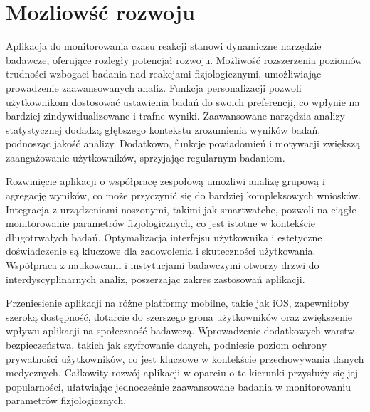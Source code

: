 \section{Mozliowść rozwoju}
Aplikacja do monitorowania czasu reakcji stanowi dynamiczne narzędzie badawcze, oferujące rozległy potencjał rozwoju. Możliwość rozszerzenia poziomów trudności wzbogaci badania nad reakcjami fizjologicznymi, umożliwiając prowadzenie zaawansowanych analiz. Funkcja personalizacji pozwoli użytkownikom dostosować ustawienia badań do swoich preferencji, co wpłynie na bardziej zindywidualizowane i trafne wyniki. Zaawansowane narzędzia analizy statystycznej dodadzą głębszego kontekstu zrozumienia wyników badań, podnosząc jakość analizy. Dodatkowo, funkcje powiadomień i motywacji zwiększą zaangażowanie użytkowników, sprzyjając regularnym badaniom.

Rozwinięcie aplikacji o współpracę zespołową umożliwi analizę grupową i agregację wyników, co może przyczynić się do bardziej kompleksowych wniosków. Integracja z urządzeniami noszonymi, takimi jak smartwatche, pozwoli na ciągłe monitorowanie parametrów fizjologicznych, co jest istotne w kontekście długotrwałych badań. Optymalizacja interfejsu użytkownika i estetyczne doświadczenie są kluczowe dla zadowolenia i skuteczności użytkowania. Współpraca z naukowcami i instytucjami badawczymi otworzy drzwi do interdyscyplinarnych analiz, poszerzając zakres zastosowań aplikacji.

Przeniesienie aplikacji na różne platformy mobilne, takie jak iOS, zapewniłoby szeroką dostępność, dotarcie do szerszego grona użytkowników oraz zwiększenie wpływu aplikacji na społeczność badawczą. Wprowadzenie dodatkowych warstw bezpieczeństwa, takich jak szyfrowanie danych, podniesie poziom ochrony prywatności użytkowników, co jest kluczowe w kontekście przechowywania danych medycznych. Całkowity rozwój aplikacji w oparciu o te kierunki przysłuży się jej popularności, ułatwiając jednocześnie zaawansowane badania w monitorowaniu parametrów fizjologicznych.